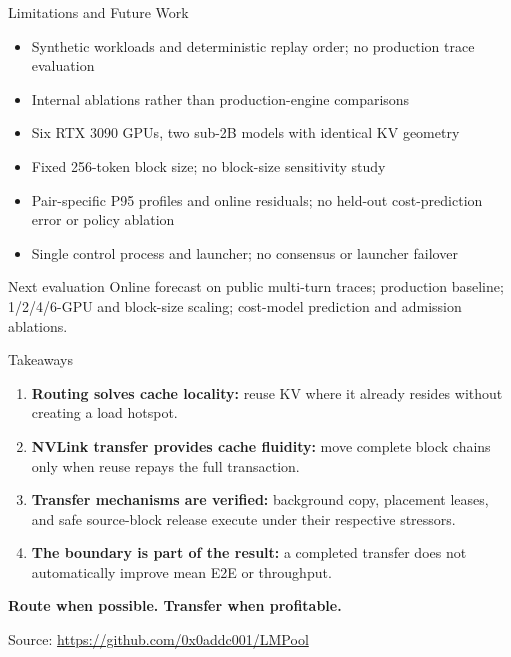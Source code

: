 \documentclass[aspectratio=169,10pt]{beamer}
\newcommand{\metric}[1]{\textcolor{LMBlue}{\bfseries #1}}
\newcommand{\good}[1]{\textcolor{LMGreen}{\bfseries #1}}
\begin{document}
\begin{frame}{Limitations and Future Work}
  \small
  \begin{itemize}
    \item Synthetic workloads and deterministic replay order; no production trace evaluation
    \item Internal ablations rather than production-engine comparisons
    \item Six RTX 3090 GPUs, two sub-2B models with identical KV geometry
    \item Fixed 256-token block size; no block-size sensitivity study
    \item Pair-specific P95 profiles and online residuals; no held-out cost-prediction error or policy ablation
    \item Single control process and launcher; no consensus or launcher failover
  \end{itemize}
  \vspace{0.5em}
  \begin{block}{Next evaluation}
    Online forecast on public multi-turn traces; production baseline; 1/2/4/6-GPU and block-size scaling; cost-model prediction and admission ablations.
  \end{block}
\end{frame}

\begin{frame}{Takeaways}
  \begin{enumerate}
    \item \metric{Routing solves cache locality:} reuse KV where it already resides without creating a load hotspot.
    \item \metric{NVLink transfer provides cache fluidity:} move complete block chains only when reuse repays the full transaction.
    \item \metric{Transfer mechanisms are verified:} background copy, placement leases, and safe source-block release execute under their respective stressors.
    \item \metric{The boundary is part of the result:} a completed transfer does not automatically improve mean E2E or throughput.
  \end{enumerate}
  \vspace{1em}
  \begin{center}
    \Large\good{Route when possible. Transfer when profitable.}
  \end{center}
  \vfill
  \begin{center}
    \small Source: \url{https://github.com/0x0addc001/LMPool}
  \end{center}
\end{frame}
\end{document}
